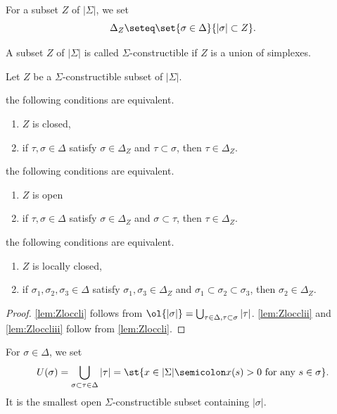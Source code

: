For a subset $Z$ of $|\Sigma|$,
we set \[\Delta_Z\seteq\set{\sigma\in \Delta}{|\sigma|\subset Z}.\]

A subset $Z$ of $|\Sigma|$ is called $\Sigma$-constructible if
$Z$ is a union of simplexes.

\begin{lemma}\label{lem:Zloccl}
Let $Z$ be a $\Sigma$-constructible subset of $|\Sigma|$.
\begin{enumeratei}
\item\label{lem:Zloccli} the following conditions are equivalent.
\begin{enumerate}
\item\label{lem:Zlocclia} $Z$ is closed,
\item\label{lem:Zlocclib}
if $\tau, \sigma\in\Delta$ satisfy
$\sigma\in\Delta_Z$ and $\tau\subset \sigma$, then
$\tau\in \Delta_Z$.
\end{enumerate}
\item\label{lem:Zlocclii} the following conditions are equivalent.
\begin{enumerate}
\item\label{lem:Zloccliia} $Z$ is open
\item\label{lem:Zloccliib}
if $\tau, \sigma\in\Delta$ satisfy
$\sigma\in\Delta_Z$ and $\sigma\subset \tau$, then
$\tau\in \Delta_Z$.
\end{enumerate}
\item\label{lem:Zloccliii} the following conditions are equivalent.
\begin{enumerate}
\item\label{lem:Zloccliiia} $Z$ is locally closed,
\item\label{lem:Zloccliiib}
if $\sigma_1, \sigma_2,\sigma_3\in\Delta$ satisfy
$\sigma_1,\sigma_3\in\Delta_Z$ and $\sigma_1\subset \sigma_2\subset \sigma_3$,
then
$\sigma_2\in \Delta_Z$.
\end{enumerate}
\end{enumeratei}
\end{lemma}

\begin{proof}
\eqref{lem:Zloccli} follows from $\ol{|\sigma|}=\bigcup_{\tau\in\Delta,\tau\subset\sigma}|\tau|$.
\eqref{lem:Zlocclii} and \eqref{lem:Zloccliii} follow from \eqref{lem:Zloccli}.
\end{proof}

For $\sigma\in\Delta$, we set
\[U(\sigma)=\bigcup_{\sigma\subset \tau\in\Delta}|\tau| = \st{x\in|\Sigma|\semicolon x(s)>0\text{ for any } s\in\sigma}.\]
It is the smallest open $\Sigma$-constructible subset containing $|\sigma|$.

